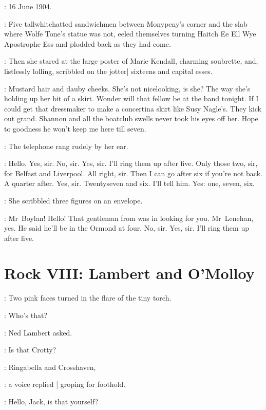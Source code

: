 \missdunne:
16 June 1904.

\begin{interject}
    :
    Five tall\-white\-hatted sandwichmen
    between Monypeny's corner and the slab where Wolfe Tone's statue was not,
    eeled themselves turning
    Haitch Ee Ell Wye Apostrophe Ess \stage{[H.E.L.Y.'S]}
    and plodded back as they had come.
\end{interject}

:
Then she stared at the large poster of Marie Kendall,%
charming soubrette,
and,
listlessly lolling,
scribbled on the jotter|
sixteens and capital esses.

\dunneint:
Mustard hair and dauby cheeks.
She's not nicelooking, is she?
The way she's holding up her bit of a skirt.
Wonder will that fellow be at the band tonight.
If I could get that dressmaker
to make a concertina skirt like Susy Nagle's.
They kick out grand.
Shannon and all the boatclub swells never took his eyes off her.
Hope to goodness
he won't keep me here till seven.

:
The telephone rang rudely by her ear.

\missdunne:
Hello.
Yes, sir.
No, sir.
Yes, sir.
I'll ring them up after five.
Only those two, sir, for Belfast and Liverpool.%
All right, sir.
Then I can go after six if you're not back.
A quarter after.
Yes, sir.
Twentyseven and six.
I'll tell him.
Yes: one, seven, six.

:
She scribbled three figures on an envelope.

\missdunne:
Mr~Boylan!
Hello!
That gentleman from  was in looking for you.
Mr~Lenehan, yes.
He said he'll be in the Ormond at four.
No, sir.
Yes, sir.
I'll ring them up after five.


\section*{Rock VIII: Lambert and O'Molloy}


:
Two pink faces turned in the flare of the tiny torch.

\lambert:
Who's that?

:
Ned Lambert asked.

\lambert:
Is that Crotty?

\jjom:
Ringabella and Crosshaven,%

:
a voice replied |
groping for foothold.

\lambert:
Hello, Jack, is that yourself?

